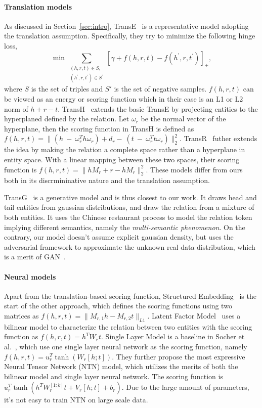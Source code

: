 \documentclass[twocolumn,a4paper,10pt,review,3p]{elsarticle}
\begin{document}
\paragraph{Translation models} As discussed in Section~\ref{sec:intro}, TransE~\cite{TransE2013} is a representative model adopting the translation assumption. Specifically, they try to minimize the following hinge loss,
\[
    \min\sum_{\substack{(h, r, t)\in S,\\ (h^\prime, r, t^\prime)\in S^\prime }}
        {\left[\gamma + f(h, r, t) - f(h^\prime, r, t^\prime)\right]}_+,
\]
where $S$ is the set of triples and $S'$ is the set of negative samples. $f(h, r, t)$ can be viewed as an energy or scoring function which in their case is an L1 or L2 norm of $h + r - t$. TransH~\cite{TransH2014} extends the basic TransE by projecting entities to the hyperplaned defined by the relation. Let $\omega_r$ be the normal vector of the hyperplane, then the scoring function in TransH is defined as $f(h, r, t) = \lVert(h~-~\omega_r^T h \omega_r) + d_r -~(t~-~\omega_r^T t \omega_r)\rVert_2^2 $.
TransR~\cite{TransR2015} futher extends the idea by making the relation a complete space rather than a hyperplane in entity space. With a linear mapping between these two spaces, their scoring function is $f(h, r, t) = \lVert hM_r + r - h M_r \rVert_2^2$. These models differ from ours both in its discrmininative nature and the translation assumption.

TransG~\cite{TransG} is a generative model and is thus closest to our work. It draws head and tail entities from gaussian distributions, and draw the relation from a mixture of both entities. It uses the Chinese restaurant process to model the relation token implying different semantics, namely the \emph{multi-semantic phenomenon}.
On the contrary, our model doesn't assume explicit gaussian density, but uses the adversarial framework to approximate the unknown real data distribution, which is a merit of GAN~\cite{Goodfellow_2016}.

\paragraph{Neural models} Apart from the translation-based scoring function, Structured Embedding~\cite{bordes2011structured_embedding} is the start of the other approach, which defines the scoring functions using two matrices as $f(h, r, t) = \lVert M_{r,1}h - M_{r,2}t \rVert_{L1}$. Latent Factor Model~\cite{jenatton2012bilinear} uses a bilinear model to characterize the relation between two entities with the scoring function as $f(h, r, t) = h^T W_r t$.
Single Layer Model is a baseline in Socher et al.~\cite{NTN}, which use one single layer neural network as the scoring function, namely $f(h, r, t)=u_r^T \tanh(W_r[h;t])$. They further propose the most expressive Neural Tensor Network (NTN) model, which utilizes the merits of both the bilinear model and single layer neural network. The scoring function is $u_r^T \tanh(h^T W_r^{[1:k]}t + V_r[h;t] + b_r)$. Due to the large amount of parameters, it's not easy to train NTN on large scale data.
\end{document}
